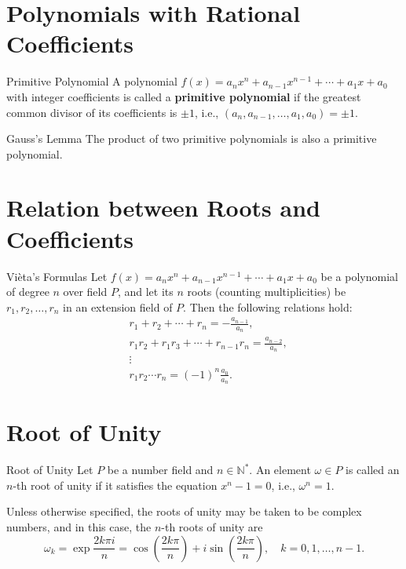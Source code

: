 \documentclass[11pt]{elegantbook}
\begin{document}
\section{Polynomials with Rational Coefficients}
\begin{definition}{Primitive Polynomial}
    A polynomial \( f(x) = a_n x^n + a_{n-1} x^{n-1} + \cdots + a_1 x + a_0 \) 
    with integer coefficients is called a \textbf{primitive polynomial}
    if the greatest common divisor of its coefficients is \(\pm 1\), 
    i.e., \( (a_n, a_{n-1}, \ldots, a_1, a_0) = \pm 1 \).
\end{definition}

\begin{lemma}{Gauss's Lemma}
    The product of two primitive polynomials is also a primitive polynomial.
\end{lemma}

\section{Relation between Roots and Coefficients}
\begin{theorem}{Vièta's Formulas}
    Let \( f(x) = a_n x^n + a_{n-1} x^{n-1} + \cdots + a_1 x + a_0 \) 
    be a polynomial of degree \( n \) over field \( P \), 
    and let its \( n \) roots (counting multiplicities) be \( r_1, r_2, \ldots, r_n \) in an extension field of \( P \). 
    Then the following relations hold:
    \[
    \begin{aligned}
    &r_1 + r_2 + \cdots + r_n = -\frac{a_{n-1}}{a_n}, \\
    &r_1 r_2 + r_1 r_3 + \cdots + r_{n-1} r_n = \frac{a_{n-2}}{a_n}, \\
    &\vdots \\
    &r_1 r_2 \cdots r_n = (-1)^n \frac{a_0}{a_n}.
    \end{aligned}
    \]
\end{theorem}

\section{Root of Unity}
\begin{definition}{Root of Unity}
    Let \( P \) be a number field and \( n \in \mathbb{N}^{*} \). 
    An element \( \omega \in P \) is called an \( n \)-th root of unity 
    if it satisfies the equation \( x^n - 1 = 0 \), i.e., \( \omega^n = 1 \).
\end{definition}

Unless otherwise specified, the roots of unity may be taken to be complex numbers, 
and in this case, the \( n \)-th roots of unity are
\[
\omega_k = \exp{\frac{2k\pi i}{n}} = \cos\left(\frac{2k\pi}{n}\right) + i\sin\left(\frac{2k\pi}{n}\right), 
\quad k = 0, 1, \ldots, n-1.
\]
\end{document}
